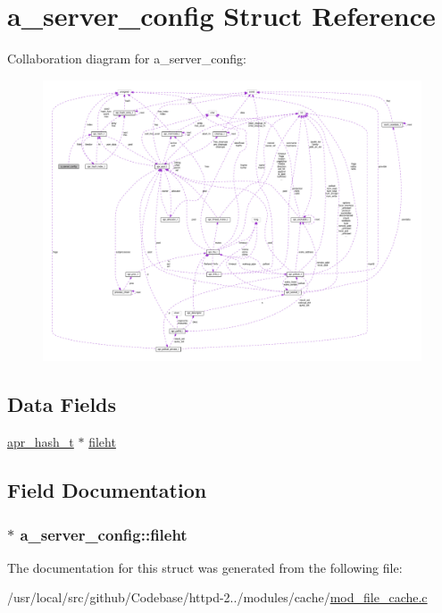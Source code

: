 \hypertarget{structa__server__config}{}\section{a\+\_\+server\+\_\+config Struct Reference}
\label{structa__server__config}


Collaboration diagram for a\+\_\+server\+\_\+config\+:
\nopagebreak
\begin{figure}[H]
\begin{center}
\leavevmode
\includegraphics[width=350pt]{structa__server__config__coll__graph}
\end{center}
\end{figure}
\subsection*{Data Fields}
\begin{DoxyCompactItemize}
\item 
\hyperlink{structapr__hash__t}{apr\+\_\+hash\+\_\+t} $\ast$ \hyperlink{structa__server__config_ab3f969ee8d8e6c336d3ea5a8034a29e4}{fileht}
\end{DoxyCompactItemize}


\subsection{Field Documentation}
\subsubsection[{\texorpdfstring{fileht}{fileht}}]{$\ast$ a\+\_\+server\+\_\+config\+::fileht}\hypertarget{structa__server__config_ab3f969ee8d8e6c336d3ea5a8034a29e4}{}\label{structa__server__config_ab3f969ee8d8e6c336d3ea5a8034a29e4}


The documentation for this struct was generated from the following file\+:\begin{DoxyCompactItemize}
\item 
/usr/local/src/github/\+Codebase/httpd-\/2../modules/cache/\hyperlink{mod__file__cache_8c}{mod\+\_\+file\+\_\+cache.\+c}\end{DoxyCompactItemize}
